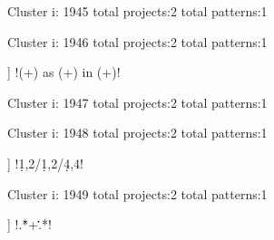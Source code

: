 Cluster i: 1945
total projects:2
total patterns:1
\begin{multicols}{1}
\end{multicols}







Cluster i: 1946
total projects:2
total patterns:1
\begin{multicols}{1}
\begin{description}[noitemsep,topsep=0pt]
\item [[2] ] \cverb!(\w+) as (\w+) in (\w+)!
\end{description}
\end{multicols}







Cluster i: 1947
total projects:2
total patterns:1
\begin{multicols}{1}
\end{multicols}







Cluster i: 1948
total projects:2
total patterns:1
\begin{multicols}{1}
\begin{description}[noitemsep,topsep=0pt]
\item [[2] ] \cverb!\d{1,2}/\d{1,2}/\d{4,4}!
\end{description}
\end{multicols}







Cluster i: 1949
total projects:2
total patterns:1
\begin{multicols}{1}
\begin{description}[noitemsep,topsep=0pt]
\item [[2] ] \cverb!.*\.\.\.\s+\.\.\..*!
\end{description}
\end{multicols}







